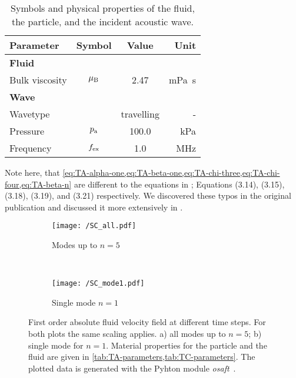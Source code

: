 \begin{table}
  \centering
  \begin{tabular}{lccr}
    \toprule
    \toprule
    {\bfseries Parameter} & {\bfseries Symbol} & {\bfseries Value} & {\bfseries 
    Unit}\\
    \midrule
    \textbf{Fluid} & & \\
    Bulk viscosity & $\mu_{\mathrm{B}}$ & 2.47 & \si{\milli\pascal\second} \\
    \midrule
    \textbf{Wave} & & \\
    Wavetype &  & travelling & - \\
    Pressure & $p_{\mathrm{a}}$ & 100.0 & \si{\kilo\pascal} \\
    Frequency & $f_{\mathrm{ex}}$ & 1.0 & \si{\MHz} \\
    \bottomrule
    \bottomrule
  \end{tabular}
  \caption{Symbols and physical properties of the fluid, the particle, and the 
  incident acoustic wave.}\label{tab:TA-parameters}
\end{table}

Note here, that 
\cref{eq:TA-alpha-one,eq:TA-beta-one,eq:TA-chi-three,eq:TA-chi-four,eq:TA-beta-n} 
are different to the equations in ; Equations (3.14), 
(3.15), (3.18), (3.19), and (3.21) respectively. We discovered these typos in 
the original publication and discussed it more extensively in 
.

\begin{figure}
  \centering
  \begin{subfigure}[b]{\textwidth}
    \centering
    \caption{Modes up to $n=5$}
    \texttt{[image: /SC\_all.pdf]}
    \label{fig:TA-SC_all}
  \end{subfigure}\\%
  \begin{subfigure}[b]{\textwidth}
    \centering
    \caption{Single mode $n=1$}
    \texttt{[image: /SC\_mode1.pdf]}
    \label{fig:TA-SC_mode1}
  \end{subfigure}
  \caption{First order absolute fluid velocity field at different time steps. 
  For both plots the same scaling applies. a) all modes up to $n=5$; b) single 
  mode for $n=1$. Material properties for the particle and the fluid are given 
  in \cref{tab:TA-parameters,tab:TC-parameters}. The plotted data is generated 
  with the Pyhton module \emph{osaft}~\cite{FankhauserPython2022}.}
  \label{fig:TA-SC}
\end{figure}

